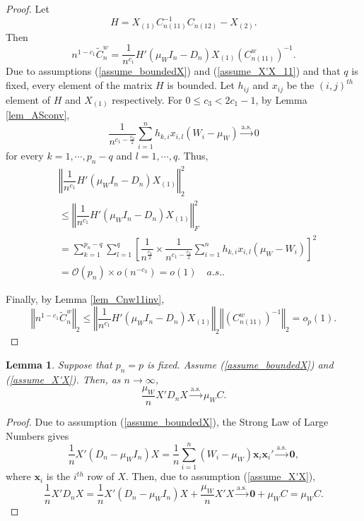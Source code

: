 \documentclass[ejs,authoryear,linksfromyear]{imsart}
\newcommand{\sumin}{\sum_{i=1}^n} %
\newcommand{\CONV}[1]{\stackrel{\text{#1}}{\longrightarrow}} %
\newcommand{\cnwa}{C_{n(11)}^w}
\numberwithin{equation}{section}
\theoremstyle{plain}
\newtheorem{lem}{Lemma}[section]
\begin{document}
\begin{proof}
Let 
$$
H = X_{(1)} C_{n(11)}^{-1} C_{n(12)} - X_{(2)}.
$$
Then 
$$
n^{1-c_1} \widetilde{C}^w_n 
= \dfrac{1}{n^{c_1}} H'(\mu_W I_n - D_n) X_{(1)} 
\left( \cnwa \right)^{-1}.
$$
Due to assumptions (\ref{assume_boundedX}) and (\ref{assume_X'X_11}) and that $q$ is fixed, every element of the matrix $H$ is bounded. Let $h_{ij}$ and $x_{ij}$ be the $(i,j)^{th}$ element of $H$ and $X_{(1)}$ respectively. For $0 \leq c_3 < 2 c_1 - 1$, by Lemma \ref{lem_ASconv},  
 $$
 \dfrac{1}{n^{c_1 - \frac{c_3}{2}}}
 \sumin h_{k,i} x_{i,l}
 (W_i - \mu_W)
 \CONV{a.s.} 0
 $$
 for every $k = 1, \cdots, p_n - q$ and $l = 1, \cdots, q$. Thus, 
 \begin{align*}
 &\left\Vert
 \dfrac{1}{n^{c_1}} 
 H' (\mu_W I_n - D_n) 
 X_{(1)}
 \right\Vert_2^2 \\
 &\leq \left\Vert
 \dfrac{1}{n^{c_1}} 
 H' (\mu_W I_n - D_n) 
 X_{(1)}
 \right\Vert_F^2 \\
 &= \sum_{k=1}^{p_n-q} \sum_{l=1}^q
 \left[
 	\dfrac{1}{n^{\frac{c_3}{2}}}
 	\times
 	\dfrac{1}{n^{c_1 - \frac{c_3}{2}}}
 	\sumin h_{k,i} x_{i,l}
 	(\mu_W - W_i)
 \right]^2 \\
 &= \mathcal{O}(p_n) \times o\left(n^{-c_3}\right) 
 = o(1) \quad {a.s.} .
 \end{align*}

 
 Finally, by Lemma \ref{lem_Cnw11inv},
 $$
 \left\Vert
 	n^{1-c_1} \widetilde{C}^w_n 
 \right\Vert_2 
 \leq 
 \left\Vert
 	\dfrac{1}{n^{c_1}} 
 	H' (\mu_W I_n - D_n) 
 	X_{(1)}
 \right\Vert_2
 \left\Vert
 	\left( \cnwa \right)^{-1} 
 \right\Vert_2
 = o_p(1). 
 $$
\end{proof}	

\begin{lem} \label{lem_X'DnX}
	Suppose that $p_n = p$ is fixed. Assume (\ref{assume_boundedX}) and (\ref{assume_X'X}). Then, as $n \to \infty$, 
	$$
	\dfrac{\mu_W}{n} X' D_n X
	\CONV{a.s.} \mu_W C. 
	$$
\end{lem} 

\begin{proof}
	Due to assumption (\ref{assume_boundedX}), the Strong Law of Large Numbers gives 
	$$
	\dfrac{1}{n} X' (D_n -\mu_W I_n) X 
	= \dfrac{1}{n} \sumin (W_i - \mu_W) \bm{x}_i \bm{x}_i' 
	\CONV{a.s.} \bm{0},
	$$ 
	where $\bm{x}_i$ is the $i^{th}$ row of $X$. Then, due to assumption (\ref{assume_X'X}), 
	$$
	\dfrac{1}{n} X' D_n X 
	= \dfrac{1}{n} X' (D_n - \mu_W I_n) X 
	+ \dfrac{\mu_W}{n} X'X
	\CONV{a.s.} \bm{0} + \mu_W C = \mu_W C.
	$$ 
\end{proof}
\end{document}
